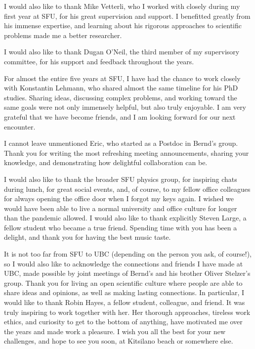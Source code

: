 I would also like to thank Mike Vetterli, who I worked with closely during my first year at SFU, for his great supervision and support.
I benefitted greatly from his immense expertise, and learning about his rigorous approaches to scientific problems made me a better researcher. 

I would also like to thank Dugan O'Neil, the third member of my supervisory committee, for his support and feedback throughout the years. 

For almost the entire five years at SFU, I have had the chance to work closely with Konstantin Lehmann, who shared almost the same timeline for his PhD studies. Sharing ideas, discussing complex problems, and working toward the same goals were not only immensely helpful, but also truly enjoyable. I am very grateful that we have become friends, and I am looking forward for our next encounter. 

I cannot leave unmentioned Eric, who started as a Postdoc in Bernd's group. Thank you for writing the most refreshing meeting announcements, sharing your knowledge, and demonstrating how delightful collaboration can be.

I would also like to thank the broader SFU physics group, for inspiring chats during lunch, for great social events, and, of course, to my fellow office colleagues for always opening the office door when I forgot my keys again. 
I wished we would have been able to live a normal university and office culture for longer than the pandemic allowed. 
I would also like to thank explicitly Steven Large, a fellow student who became a true friend. Spending time with you has been a delight, and thank you for having the best music taste. 

It is not too far from SFU to UBC (depending on the person you ask, of course!), so I would also like to acknowledge the connections and friends I have made at UBC, made possible by joint meetings of Bernd's and his brother Oliver Stelzer's group. 
Thank you for living an open scientific culture where people are able to share ideas and opinions, as well as making lasting connections. 
In particular, I would like to thank Robin Hayes, a fellow student, colleague, and friend. It was truly inspiring to work together with her. Her thorough approaches, tireless work ethics, and curiosity to get to the bottom of anything, have motivated me over the years and made work a pleasure. I wish you all the best for your new challenges, and hope to see you soon, at Kitsilano beach or somewhere else. 

